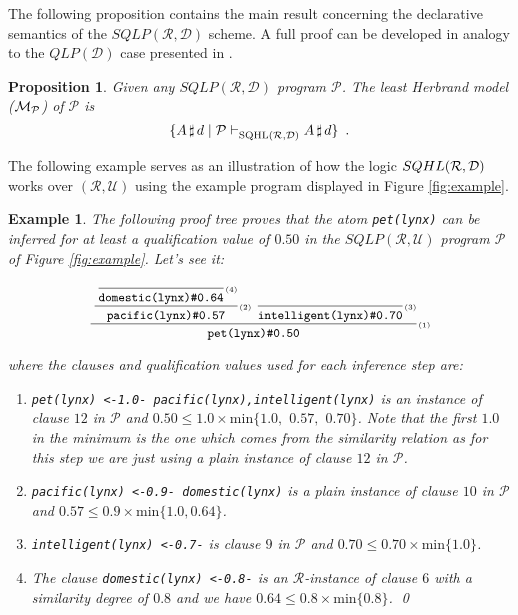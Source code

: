 \documentclass{sigplanconf}
\newcommand{\qdom}{\mathcal{D}} \newcommand{\dqdom}{D \setminus \{\bot\}} \newcommand{\bqdom}{(D \setminus \{\bot\}) \uplus \{?\}}
\newcommand{\U}{\mathcal{U}}
\newcommand{\simrel}{\mathcal{R}}
\newcommand{\qlp}[1]{QLP({#1})} \newcommand{\slp}[2]{SLP({#1,#2})} \newcommand{\sqlp}[2]{SQLP({#1,#2})} \newcommand{\bqlp}[1]{BQLP({#1})} \newcommand{\clp}[1]{CLP({#1})}
\newcommand{\Prog}{\mathcal{P}} \newcommand{\UProg}{\mathcal{P_U}}
\theoremstyle{definition}
\theoremstyle{plain}
\newtheorem{proposition}{Proposition}
\newtheorem{example}{Example}
\begin{document}
The following proposition contains the main result concerning the declarative semantics of the $\sqlp{\simrel}{\qdom}$ scheme. A full proof can be developed in analogy to the $\qlp{\qdom}$ case presented in \cite{RR08,RR08TR}.

\begin{proposition}\label{prop:least-model}
Given any $\sqlp{\simrel}{\qdom}$ program $\Prog$. The \emph{least Herbrand model} ($\Mp$) of $\Prog$ is \[\{\at{A}{d} \mid \Prog \sqhlrd \at{A}{d}\} \enspace .\]
\end{proposition}

The following example serves as an illustration of how the logic $\sqhl{\simrel}{\qdom}$ works over $(\simrel,\U)$ using the example program displayed in Figure  \ref{fig:example}.

\begin{example}\label{ex:least-model}
The following proof tree proves that the atom \emph{\texttt{pet(ly\-nx)}} can be inferred for at least a qualification value of $0.50$ in the $\sqlp{\simrel}{\U}$ program $\Prog$ of Figure \ref{fig:example}. Let's see it:

$$
\displaystyle\frac
{
  \,\displaystyle\frac
  {
    \,\displaystyle\frac
    {}
    {\mbox{\tt\small domestic(lynx)\#0.64}} \mbox{\tiny (4)}
  }
  {\mbox{\tt\small pacific(lynx)\#0.57}} \mbox{\tiny (2)}
  \,\,
  \displaystyle\frac
  {}
  {\mbox{\tt\small intelligent(lynx)\#0.70}} \mbox{\tiny (3)}
}
{\mbox{\tt\small pet(lynx)\#0.50}} \mbox{\tiny (1)}
$$

\noindent where the clauses and qualification values used for each inference step are:

\begin{enumerate}
    \item[(1)] \emph{\texttt{pet(lynx) <-1.0- pacific(lynx),intelligent(lynx)}} is an instance of clause $12$ in $\Prog$ and $0.50 \le 1.0 \times \mathrm{min} \{1.0,$ $0.57,$ $0.70\}$. Note that the first $1.0$ in the minimum is the one which comes from the similarity relation as for this step we are just using a plain instance of clause $12$ in $\Prog$.
    \item[(2)] \emph{\texttt{pacific(lynx) <-0.9- domestic(lynx)}} is a plain instance of clause $10$ in $\Prog$ and $0.57 \le 0.9 \times \mathrm{min} \{1.0, 0.64\}$.
    \item[(3)] \emph{\texttt{intelligent(lynx) <-0.7-}} is clause $9$ in $\Prog$ and $0.70 \le 0.70 \times \mathrm{min} \{1.0\}$.
    \item[(4)] The clause \emph{\texttt{domestic(lynx) <-0.8-}} is an $\simrel$-instance of clause $6$ with a similarity degree of $0.8$ and we have $0.64 \le 0.8 \times \mathrm{min} \{0.8\}$. \qed
\end{enumerate}
\end{example}
\end{document}
